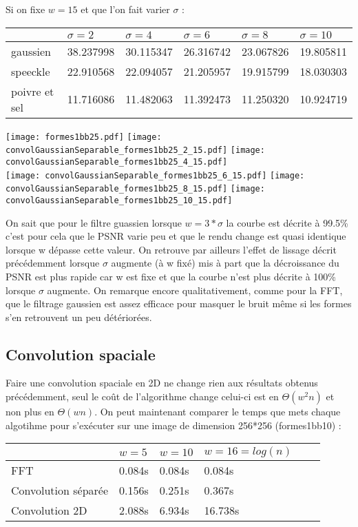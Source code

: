 \documentclass[12pt]{article}
\numberwithin{equation}{section}
\begin{document}
Si on fixe $w = 15$ et que l'on fait varier $\sigma$ :
\begin{center}
  \begin{tabular}{|l|l|l|l|l|l|}
    \hline
    & $\sigma = 2$ & $\sigma = 4$ & $\sigma = 6$  & $\sigma = 8$ & $\sigma = 10$ \\
    \hline
    gaussien & 38.237998  & 30.115347  & 26.316742 & 23.067826  & 19.805811\\
    \hline
    speeckle & 22.910568  & 22.094057 & 21.205957  &19.915799 & 18.030303 \\
    \hline
    poivre et sel & 11.716086  & 11.482063 & 11.392473  &  11.250320 & 10.924719\\
    \hline
  \end{tabular}
\end{center}

\begin{center}
\texttt{[image: formes1bb25.pdf]}
\texttt{[image: convolGaussianSeparable\_formes1bb25\_2\_15.pdf]}
\texttt{[image: convolGaussianSeparable\_formes1bb25\_4\_15.pdf]}\\
\texttt{[image: convolGaussianSeparable\_formes1bb25\_6\_15.pdf]}
\texttt{[image: convolGaussianSeparable\_formes1bb25\_8\_15.pdf]}
\texttt{[image: convolGaussianSeparable\_formes1bb25\_10\_15.pdf]}\\
\end{center}

On sait que pour le filtre guassien lorsque $w = 3*\sigma$ la courbe est décrite à 99.5\% c'est pour cela que le PSNR varie peu et que le rendu change est quasi identique lorsque w dépasse cette valeur. On retrouve par ailleurs l'effet de lissage décrit précédemment lorsque $\sigma$ augmente (à w fixé) mis à part que la décroissance du PSNR est plus rapide car w est fixe et que la courbe n'est plus décrite à 100\% lorsque $\sigma$ augmente. On remarque encore qualitativement, comme pour la FFT, que le filtrage gaussien est assez efficace pour masquer le bruit même si les formes s'en retrouvent un peu détériorées.
\subsection{Convolution spaciale}
Faire une convolution spaciale en 2D ne change rien aux résultats obtenus précédemment, seul le coût de l'algorithme change celui-ci est en $\Theta(w^2n)$ et non plus en $\Theta(wn)$. On peut maintenant comparer le temps que mets chaque algotihme pour s'exécuter sur une image de dimension 256*256 (formes1bb10) :
\begin{center}
  \begin{tabular}{|l|l|l|l|l|l|}
    \hline
    & $w = 5$ & $w = 10$ & $w = 16 = log(n)$ \\
    \hline
    FFT & 0.084s & 0.084s & 0.084s\\
    \hline
    Convolution séparée &  0.156s &  0.251s & 0.367s\\
    \hline
    Convolution 2D & 2.088s & 6.934s & 16.738s \\
    \hline
  \end{tabular}
\end{center}
\end{document}
